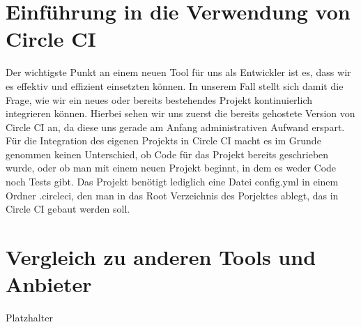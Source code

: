 \documentclass{article}
\begin{document}
\section{Einführung in die Verwendung von Circle CI}
Der wichtigste Punkt an einem neuen Tool für uns als Entwickler ist es, dass wir es effektiv und effizient einsetzten können. In unserem Fall stellt sich damit die Frage, wie wir ein neues oder bereits bestehendes Projekt kontinuierlich integrieren können. Hierbei sehen wir uns zuerst die bereits gehostete Version von Circle CI an, da diese uns gerade am Anfang administrativen Aufwand erspart. Für die Integration des eigenen Projekts in Circle CI macht es im Grunde genommen keinen Unterschied, ob Code für das Projekt bereits geschrieben wurde, oder ob man mit einem neuen Projekt beginnt, in dem es weder Code noch Tests gibt. Das Projekt benötigt lediglich eine Datei config.yml in einem Ordner .circleci, den man in das Root Verzeichnis des Porjektes ablegt, das in Circle CI gebaut werden soll.

\section {Vergleich zu anderen Tools und Anbieter}
Platzhalter
\end{document}
